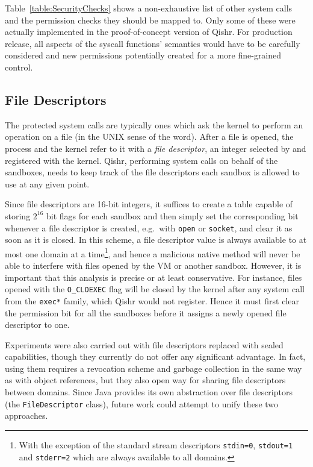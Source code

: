 \documentclass[a4paper,12pt,twoside,openright]{report}
\newcommand{\class}[1]{\texttt{#1}}
\begin{document}
Table~\ref{table:SecurityChecks} shows a non-exhaustive list of other system calls and the permission checks they should be mapped to. Only some of these were actually implemented in the proof-of-concept version of Qishr. For production release, all aspects of the syscall functions' semantics would have to be carefully considered and new permissions potentially created for a more fine-grained control.

\subsection{File Descriptors}

The protected system calls are typically ones which ask the kernel to perform an operation on a file (in the UNIX sense of the word). After a file is opened, the process and the kernel refer to it with a \emph{file descriptor}, an integer selected by and registered with the kernel. Qishr, performing system calls on behalf of the sandboxes, needs to keep track of the file descriptors each sandbox is allowed to use at any given point.

Since file descriptors are 16-bit integers, it suffices to create a table capable of storing $2^{16}$ bit flags for each sandbox and then simply set the corresponding bit whenever a file descriptor is created, e.g.\ with \texttt{open} or \texttt{socket}, and clear it as soon as it is closed. In this scheme, a file descriptor value is always available to at most one domain at a time\footnote{With the exception of the standard stream descriptors \texttt{stdin=0}, \texttt{stdout=1} and \texttt{stderr=2} which are always available to all domains.}, and hence a malicious native method will never be able to interfere with files opened by the VM or another sandbox. However, it is important that this analysis is precise or at least conservative. For instance, files opened with the \texttt{O\_CLOEXEC} flag will be closed by the kernel after any system call from the \texttt{exec*} family, which Qishr would not register. Hence it must first clear the permission bit for all the sandboxes before it assigns a newly opened file descriptor to one.

Experiments were also carried out with file descriptors replaced with sealed capabilities, though they currently do not offer any significant advantage. In fact, using them requires a revocation scheme and garbage collection in the same way as with object references, but they also open way for sharing file descriptors between domains. Since Java provides its own abstraction over file descriptors (the \class{FileDescriptor} class), future work could attempt to unify these two approaches.
\end{document}

